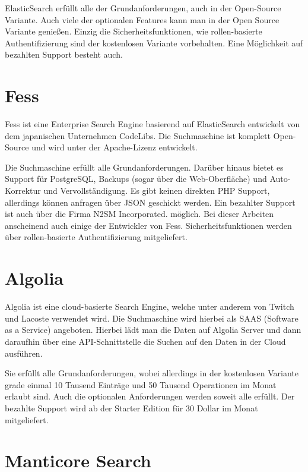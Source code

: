 ElasticSearch erfüllt alle der Grundanforderungen, auch in der Open-Source Variante. Auch viele der optionalen Features kann man in der Open Source Variante genießen. Einzig die Sicherheitsfunktionen, wie rollen-basierte Authentifizierung sind der kostenlosen Variante vorbehalten. Eine Möglichkeit auf bezahlten Support besteht auch. \cite{Elasticsearch.2019}

\section{Fess}
\label{fess}

Fess ist eine Enterprise Search Engine basierend auf ElasticSearch entwickelt von dem japanischen Unternehmen CodeLibs. Die Suchmaschine ist komplett Open-Source und wird unter der Apache-Lizenz entwickelt.

Die Suchmaschine erfüllt alle Grundanforderungen. Darüber hinaus bietet es Support für PostgreSQL, Backups (sogar über die Web-Oberfläche) und Auto-Korrektur und Vervollständigung. Es gibt keinen direkten PHP Support, allerdings können anfragen über JSON geschickt werden. Ein bezahlter Support ist auch über die Firma N2SM Incorporated. \cite{N2SM.2019} möglich. Bei dieser Arbeiten anscheinend auch einige der Entwickler von Fess. Sicherheitsfunktionen werden über rollen-basierte Authentifizierung mitgeliefert. \cite{CodeLibs.2019}

\section{Algolia}
\label{algolia}

Algolia ist eine cloud-basierte Search Engine, welche unter anderem von Twitch und Lacoste verwendet wird. Die Suchmaschine wird hierbei als SAAS (Software as a Service) angeboten.  Hierbei lädt man die Daten auf Algolia Server und dann daraufhin über eine API-Schnittstelle die Suchen auf den Daten in der Cloud ausführen.

Sie erfüllt alle Grundanforderungen, wobei allerdings in der kostenlosen Variante grade einmal 10 Tausend Einträge und 50 Tausend Operationen im Monat erlaubt sind. Auch die optionalen Anforderungen werden soweit alle erfüllt. Der bezahlte Support wird ab der Starter Edition für 30 Dollar im Monat mitgeliefert. \cite{Algolia.2019}

\section{Manticore Search}
\label{manticore}

